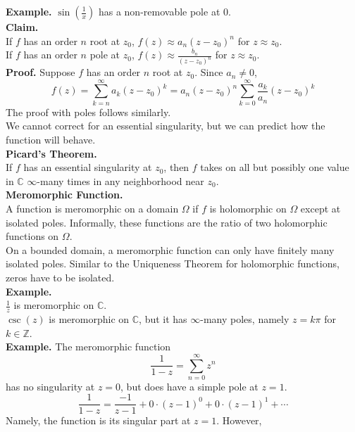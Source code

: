 \documentclass[11pt]{article}
\begin{document}
\newline
\textbf{Example.} $\sin(\frac{1}{x})$ has a non-removable pole at 0. \\
\newline
\textbf{Claim.} \\
If $f$ has an order $n$ root at $z_0$, $ f(z) \approx a_n(z - z_0)^n $ for $ z \approx z_0$. \\
If $f$ has an order $n$ pole at $z_0$, $f(z) \approx \frac{b_n}{(z - z_0)^n}$ for $z \approx z_0$. \\
\textbf{Proof.} Suppose $f$ has an order $n$ root at $z_0$. Since $a_n \neq 0$,
$$f(z) = \sum_{k = n}^{\infty}a_k(z - z_0)^k = a_n(z - z_0)^n\sum_{k = 0}^{\infty}\frac{a_k}{a_n}(z - z_0)^k$$
The proof with poles follows similarly. \\
We cannot correct for an essential singularity, but we can predict how the function will behave. \\
\newline
\textbf{Picard's Theorem.} \\
If $f$ has an essential singularity at $z_0$, then $f$ takes on all but possibly one value in $\mathbb{C}$ $\infty$-many times in any neighborhood near $z_0$. \\
\newline
\textbf{Meromorphic Function.} \\
A function is meromorphic on a domain $\Omega$ if $f$ is holomorphic on $\Omega$ except at isolated poles. Informally, these functions are the ratio of two holomorphic functions on $\Omega$. 
\\
\newline
On a bounded domain, a meromorphic function can only have finitely many isolated poles. Similar to the Uniqueness Theorem for holomorphic functions, zeros have to be isolated. \\
\newline
\textbf{Example.} \\
$\frac{1}{z}$ is meromorphic on $\mathbb{C}$. \\
$\csc(z)$ is meromorphic on $\mathbb{C}$, but it has $\infty$-many poles, namely $z = k\pi$ for $k \in \mathbb{Z}$. \\
\newline
\textbf{Example.} The meromorphic function 
$$ \frac{1}{1 - z} = \sum_{n = 0}^{\infty}z^n$$
has no singularity at $z = 0$, but does have a simple pole at $z = 1$. 
$$ \frac{1}{1 - z} = \frac{-1}{z - 1} + 0\cdot (z - 1)^0 + 0\cdot(z - 1)^1 + \cdots $$
Namely, the function is its singular part at $z = 1$. However, \\
\end{document}
